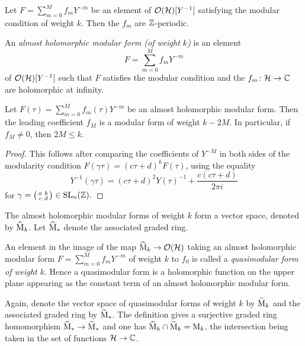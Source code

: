 \begin{cor}
 Let $F=\sum_{m=0}^Mf_mY^{-m}$ be an element of $\mathcal{O}(\mathcal{H})[Y^{-1}]$ satisfying the modular condition of weight $k$. Then the $f_m$ are $\mathbb{Z}$-periodic.
\end{cor}

\begin{defi}
 An \emph{almost holomorphic modular form (of weight $k$)} is an element
 \[F=\sum_{m=0}^Mf_mY^{-m}\]
 of $\mathcal{O}(\mathcal{H})[Y^{-1}]$ such that $F$ satisfies the modular condition and the
 $f_m\colon \mathcal{H}\to \mathbb{C}$ are holomorphic at infinity.
\end{defi}

\begin{prop}
 Let $F(\tau)=\sum_{m=0}^Mf_m(\tau)Y^{-m}$ be an almost holomorphic modular form. Then the leading coefficient $f_M$ is a modular form of weight $k-2M$. In particular, if $f_M \neq 0$, then $2M \leq k$.
\end{prop}
\begin{proof}
 This follows after comparing the coefficients of $Y^{-M}$ in both sides of the modularity condition $F(\gamma\tau)=(c\tau+d)^kF(\tau)$, using the equality \[Y^{-1}(\gamma\tau)=(c\tau+d)^2Y(\tau)^{-1}+\frac{c(c\tau+d)}{2\pi i}\]
 for $\gamma=
 \bigl(\begin{smallmatrix}
 a&b\\ c&d
 \end{smallmatrix} \bigr)
 \in \operatorname{SL}_n(\mathbb{Z}).$
\end{proof}

The almost holomorphic modular forms of weight $k$ form a vector space, denoted by $\widehat{\mathrm{M}}_k$. Let $\widehat{\mathrm{M}}_*$ denote the associated graded ring.

\begin{defi}
 An element in the image of the map $\widehat{\mathrm{M}}_k\to\mathcal{O}(\mathcal{H})$ taking an almost holomorphic modular form $F=\sum_{m=0}^Mf_mY^{-m}$ of weight $k$ to $f_0$ is called a \emph{quasimodular form of weight $k$}. Hence a quasimodular form is a holomorphic function on the upper plane appearing as the constant term of an almost holomorphic modular form.
\end{defi}

Again, denote the vector space of quasimodular forms of weight $k$ by $\widetilde{\mathrm{M}}_k$ and the associated graded ring by $\widetilde{\mathrm{M}}_*$. The definition gives a surjective graded ring homomorphism $\widehat{\mathrm{M}}_*\to\widetilde{\mathrm{M}}_*$ and one has $\widehat{\mathrm{M}}_k \cap \widetilde{\mathrm{M}}_k = \mathrm{M}_k$, the intersection being taken in the set of functions $\mathcal{H}\to\mathbb{C}$.

